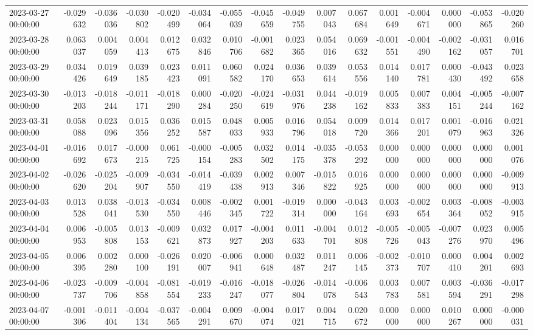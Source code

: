 \begin{tabular}{lrrrrrrrrrrrrrrr}
2023-03-27 00:00:00 & -0.029632 & -0.036036 & -0.030802 & -0.020499 & -0.034064 & -0.055039 & -0.045659 & -0.049755 & 0.007043 & 0.067684 & 0.001649 & -0.004671 & 0.000000 & -0.053865 & -0.020260 \\
2023-03-28 00:00:00 & 0.063037 & 0.004059 & 0.004413 & 0.012675 & 0.032846 & 0.010706 & -0.001682 & 0.023365 & 0.054016 & 0.069632 & -0.001551 & -0.004490 & -0.002162 & -0.031057 & 0.016701 \\
2023-03-29 00:00:00 & 0.034426 & 0.019649 & 0.039185 & 0.023423 & 0.011091 & 0.060582 & 0.024170 & 0.036653 & 0.039614 & 0.053556 & 0.014140 & 0.017781 & 0.000430 & -0.043492 & 0.023658 \\
2023-03-30 00:00:00 & -0.013203 & -0.018244 & -0.011171 & -0.018290 & 0.000284 & -0.020250 & -0.024619 & -0.031976 & 0.044238 & -0.019162 & 0.005833 & 0.007383 & 0.004151 & -0.005244 & -0.007162 \\
2023-03-31 00:00:00 & 0.058088 & 0.023096 & 0.015356 & 0.036252 & 0.015587 & 0.048033 & 0.005933 & 0.016796 & 0.054018 & 0.009720 & 0.014366 & 0.017201 & 0.001079 & -0.016963 & 0.021326 \\
2023-04-01 00:00:00 & -0.016692 & 0.017673 & -0.000215 & 0.061725 & -0.000154 & -0.005283 & 0.032502 & 0.014175 & -0.035378 & -0.053292 & 0.000000 & 0.000000 & 0.000000 & 0.000000 & 0.001076 \\
2023-04-02 00:00:00 & -0.026620 & -0.025204 & -0.009907 & -0.034550 & -0.014419 & -0.039438 & 0.002913 & 0.007346 & -0.015822 & 0.016925 & 0.000000 & 0.000000 & 0.000000 & 0.000000 & -0.009913 \\
2023-04-03 00:00:00 & 0.013528 & 0.038041 & -0.013530 & -0.034550 & 0.008446 & -0.002345 & 0.001722 & -0.019314 & 0.000000 & -0.043164 & 0.003693 & -0.002654 & 0.003364 & -0.008052 & -0.003915 \\
2023-04-04 00:00:00 & 0.006953 & -0.005808 & 0.013153 & -0.009621 & 0.032873 & 0.017927 & -0.004203 & 0.011633 & -0.004701 & 0.012808 & -0.005726 & -0.005043 & -0.007276 & 0.023970 & 0.005496 \\
2023-04-05 00:00:00 & 0.006395 & 0.002280 & 0.000100 & -0.026191 & 0.020007 & -0.006941 & 0.000648 & 0.032487 & 0.011247 & 0.006145 & -0.002373 & -0.010707 & 0.000410 & 0.004201 & 0.002693 \\
2023-04-06 00:00:00 & -0.023737 & -0.009706 & -0.004858 & -0.081554 & -0.019233 & -0.016247 & -0.018077 & -0.026804 & -0.014078 & -0.006543 & 0.003783 & 0.007581 & 0.003594 & -0.036291 & -0.017298 \\
2023-04-07 00:00:00 & -0.001306 & -0.011404 & -0.004134 & -0.037565 & -0.004291 & 0.009670 & -0.004074 & 0.017021 & 0.004715 & 0.020672 & 0.000000 & 0.000000 & 0.010267 & 0.000000 & -0.000031 \\

\end{tabular}
